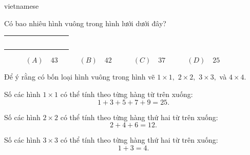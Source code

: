 \documentclass{article}
\begin{document}
\begin{otherlanguage*}{vietnamese}
\bigbreak

\begin{problem*}[PI-2024-C-P17]
    \label{problem:pi-2024-c-p17}

    Có bao nhiêu hình vuông trong hình lưới dưới đây?

    \begin{center}
        \begin{tabular}{llll|l|llll}
        \cline{5-5}
                               &                       &                       &  &  &                       &                       &                       &                       \\ \cline{4-6}
                               &                       & \multicolumn{1}{l|}{} &  &  & \multicolumn{1}{l|}{} &                       &                       &                       \\ \cline{3-7}
                               & \multicolumn{1}{l|}{} & \multicolumn{1}{l|}{} &  &  & \multicolumn{1}{l|}{} & \multicolumn{1}{l|}{} &                       &                       \\ \cline{2-8}
        \multicolumn{1}{l|}{}  & \multicolumn{1}{l|}{} & \multicolumn{1}{l|}{} &  &  & \multicolumn{1}{l|}{} & \multicolumn{1}{l|}{} & \multicolumn{1}{l|}{} &                       \\ \hline
        \multicolumn{1}{|l|}{} & \multicolumn{1}{l|}{} & \multicolumn{1}{l|}{} &  &  & \multicolumn{1}{l|}{} & \multicolumn{1}{l|}{} & \multicolumn{1}{l|}{} & \multicolumn{1}{l|}{} \\ \hline
        \end{tabular}
    \end{center}

    \[
        (A) \quad 43 \qquad \quad
        (B) \quad 42 \qquad \quad
        (C) \quad 37 \qquad \quad
        (D) \quad 25 \qquad \quad
    \]
\end{problem*}

\begin{soln}
    Để ý rằng có bốn loại hình vuông trong hình vẽ $1 \times 1,$ $2 \times 2,$ $3 \times 3,$ và $4 \times 4.$

    Số các hình $1\times 1$ có thể tính theo từng hàng từ trên xuống:
    \[
        1 + 3 + 5 + 7 + 9 = 25.
    \]

    Số các hình $2\times 2$ có thể tính theo từng hàng thứ hai từ trên xuống:
    \[
        2 + 4 + 6 = 12.
    \]

    Số các hình $3\times 3$ có thể tính theo từng hàng thứ hai từ trên xuống:
    \[
        1 + 3 = 4.
    \]


\end{soln}
\end{otherlanguage*}
\end{document}
